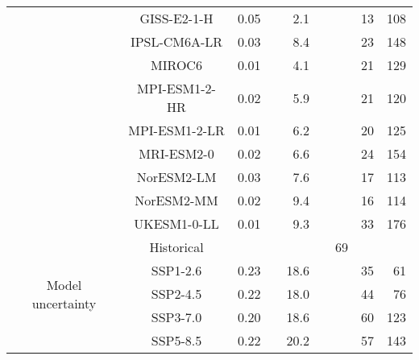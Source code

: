 \begin{table*}[t]
\begin{tabular}{c|c|rr|rr|rrr}
 & GISS-E2-1-H & 0.05 &  & 2.1 &  &  & 13 & 108 \\
 & IPSL-CM6A-LR & 0.03 &  & 8.4 &  &  & 23 & 148 \\
 & MIROC6 & 0.01 &  & 4.1 &  &  & 21 & 129 \\
 & MPI-ESM1-2-HR & 0.02 &  & 5.9 &  &  & 21 & 120 \\
 & MPI-ESM1-2-LR & 0.01 &  & 6.2 &  &  & 20 & 125 \\
 & MRI-ESM2-0 & 0.02 &  & 6.6 &  &  & 24 & 154 \\
 & NorESM2-LM & 0.03 &  & 7.6 &  &  & 17 & 113 \\
 & NorESM2-MM & 0.02 &  & 9.4 &  &  & 16 & 114 \\
 & UKESM1-0-LL & 0.01 &  & 9.3 &  &  & 33 & 176 \\
\cline{1-9}
\multirow[c]{5}{*}{Model uncertainty} & Historical &  &  &  &  & 69 &  &  \\
 & SSP1-2.6 & 0.23 &  & 18.6 &  &  & 35 & 61 \\
 & SSP2-4.5 & 0.22 &  & 18.0 &  &  & 44 & 76 \\
 & SSP3-7.0 & 0.20 &  & 18.6 &  &  & 60 & 123 \\
 & SSP5-8.5 & 0.22 &  & 20.2 &  &  & 57 & 143 \\
\cline{1-9}
\bottomrule
\end{tabular}
\end{table*}
